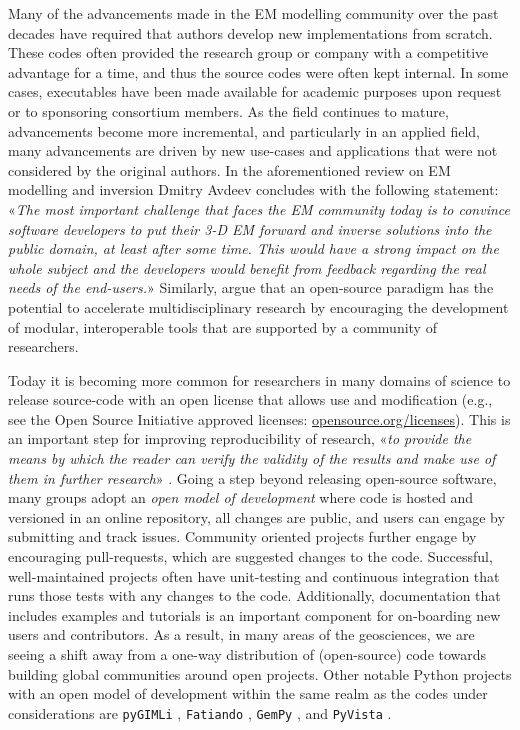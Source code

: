 \documentclass[onecolumn,extra,camera]{gji}
\begin{document}
Many of the advancements made in the EM modelling community over the past decades have required that authors develop new implementations from scratch. These codes often provided the research group or company with a competitive advantage for a time, and thus the source codes were often kept internal. In some cases, executables have been made available for academic purposes upon request or to sponsoring consortium members. As the field continues to mature, advancements become more incremental, and particularly in an applied field, many advancements are driven by new use-cases and applications that were not considered by the original authors. In the aforementioned review on EM modelling and inversion Dmitry Avdeev concludes with the following statement: «\emph{The most important challenge that faces the EM community today is to convince software developers to put their 3-D EM forward and inverse solutions into the public domain, at least after some time. This would have a strong impact on the whole subject and the developers would benefit from feedback regarding the real needs of the end-users.}» Similarly, \cite{EXG.19.Oldenburg} argue that an open-source paradigm has the potential to accelerate multidisciplinary research by encouraging the development of modular, interoperable tools that are supported by a community of researchers.

Today it is becoming more common for researchers in many domains of science to release source-code with an open license that allows use and modification (e.g., see the Open Source Initiative approved licenses: \href{https://opensource.org/licenses}{opensource.org/licenses}). This is an important step for improving reproducibility of research, «\emph{to provide the means by which the reader can verify the validity of the results and make use of them in further research}» \citep{GEO.17.Broggini}. Going a step beyond releasing open-source software, many groups adopt an \emph{open model of development} where code is hosted and versioned in an online repository, all changes are public, and users can engage by submitting and track issues. Community oriented projects further engage by encouraging pull-requests, which are suggested changes to the code. Successful, well-maintained projects often have unit-testing and continuous integration that runs those tests with any changes to the code. Additionally, documentation that includes examples and tutorials is an important component for on-boarding new users and contributors. As a result, in many areas of the geosciences, we are seeing a shift away from a one-way distribution of (open-source) code towards building global communities around open projects. Other notable Python projects with an open model of development within the same realm as the codes under considerations are \texttt{pyGIMLi} \citep{CAG.17.Rucker}, \texttt{Fatiando} \citep{JOSS.18.Uieda}, \texttt{GemPy} \citep{GMD.19.DeLaVarga}, and \texttt{PyVista} \citep{JOSS.19.Sullivan}.
\end{document}

